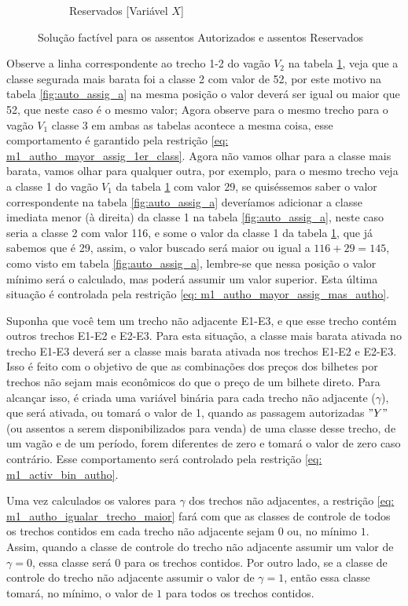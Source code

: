 \begin{figure}[h!]
\begin{subfigure}[b]{0.35\linewidth}
		\caption{Reservados [Variável $X$]}
		\label{fig:auto_assig_b}
	\end{subfigure}
	\caption{Solução factível para os assentos Autorizados e assentos Reservados}
	\label{fig:auto_assig}
\end{figure}

Observe a linha correspondente ao trecho 1-2 do vagão $V_2$ na tabela \ref{fig:auto_assig_b}, veja que a classe segurada mais barata foi a classe 2 com valor de 52, por este motivo na tabela \ref{fig:auto_assig_a} na mesma posição o valor deverá ser igual ou maior que 52, que neste caso é o mesmo valor; Agora observe para o mesmo trecho para o vagão $V_1$ classe 3 em ambas as tabelas acontece a mesma coisa, esse comportamento é garantido pela restrição \ref{eq: m1_autho_mayor_assig_1er_class}. Agora não vamos olhar para a classe mais barata, vamos olhar para qualquer outra, por exemplo, para o mesmo trecho veja a classe 1 do vagão $V_1$ da tabela \ref{fig:auto_assig_b} com valor 29, se quiséssemos saber o valor correspondente na tabela \ref{fig:auto_assig_a} deveríamos adicionar a classe imediata menor (à direita) da classe 1 na tabela \ref{fig:auto_assig_a}, neste caso seria a classe 2 com valor 116, e some o valor da classe 1 da tabela \ref{fig:auto_assig_b}, que já sabemos que é 29, assim, o valor buscado será maior ou igual a $116+29 = 145$, como visto em tabela \ref{fig:auto_assig_a}, lembre-se que nessa posição o valor mínimo será o calculado, mas poderá assumir um valor superior. Esta última situação é controlada pela restrição \ref{eq: m1_autho_mayor_assig_mas_autho}.

Suponha que você tem um trecho não adjacente E1-E3, e que esse trecho contém outros trechos E1-E2 e E2-E3. Para esta situação, a classe mais barata ativada no trecho E1-E3 deverá ser a classe mais barata ativada nos trechos E1-E2 e E2-E3. Isso é feito com o objetivo de que as combinações dos preços dos bilhetes por trechos não sejam mais econômicos do que o preço de um bilhete direto. Para alcançar isso, é criada uma variável binária para cada trecho não adjacente ($\gamma$), que será ativada, ou tomará o valor de 1, quando as passagem autorizadas $"Y"$ (ou assentos a serem disponibilizados para venda) de uma classe desse trecho, de um vagão e de um período, forem diferentes de zero e tomará o valor de zero caso contrário. Esse comportamento será controlado pela restrição \ref{eq: m1_activ_bin_autho}.

Uma vez calculados os valores para $\gamma$ dos trechos não adjacentes, a restrição \ref{eq: m1_autho_igualar_trecho_maior} fará com que as classes de controle de todos os trechos contidos em cada trecho não adjacente sejam $0$ ou, no mínimo $1$. Assim, quando a classe de controle do trecho não adjacente assumir um valor de $\gamma = 0$, essa classe será $0$ para os trechos contidos. Por outro lado, se a classe de controle do trecho não adjacente assumir o valor de $\gamma = 1$, então essa classe tomará, no mínimo, o valor de $1$ para todos os trechos contidos.

